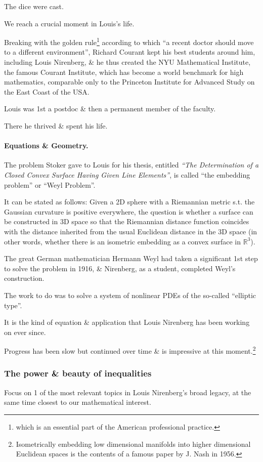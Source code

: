 \documentclass{article}
\begin{document}
The dice were cast.

We reach a crucial moment in Louis's life.

Breaking with the golden rule\footnote{which is an essential part of the American professional practice.} according to which ``a recent doctor should move to a different environment'', Richard Courant kept his best students around him, including Louis Nirenberg, \& he thus created the NYU Mathematical Institute, the famous Courant Institute, which has become a world benchmark for high mathematics, comparable only to the Princeton Institute for Advanced Study on the East Coast of the USA.

Louis was 1st a postdoc \& then a permanent member of the faculty.

There he thrived \& spent his life.

\paragraph{Equations \& Geometry.} The problem Stoker gave to Louis for his thesis, entitled \textit{``The Determination of a Closed Convex Surface Having Given Line Elements''}, is called ``the embedding problem'' or ``Weyl Problem''.

It can be stated as follows: Given a 2D sphere with a Riemannian metric s.t. the Gaussian curvature is positive everywhere, the question is whether a surface can be constructed in 3D space so that the Riemannian distance function coincides with the distance inherited from the usual Euclidean distance in the 3D space (in other words, whether there is an isometric embedding as a convex surface in $\mathbb{R}^3$).

The great German mathematician Hermann Weyl had taken a significant 1st step to solve the problem in 1916, \& Nirenberg, as a student, completed Weyl's construction.

The work to do was to solve a system of nonlinear PDEs of the so-called ``elliptic type''.

It is the kind of equation \& application that Louis Nirenberg has been working on ever since.

Progress has been slow but continued over time \& is impressive at this moment.\footnote{Isometrically embedding low dimensional manifolds into higher dimensional Euclidean spaces is the contents of a famous paper by J. Nash in 1956.}

\subsubsection{The power \& beauty of inequalities}
Focus on 1 of the most relevant topics in Louis Nirenberg's broad legacy, at the same time closest to our mathematical interest.
\end{document}
